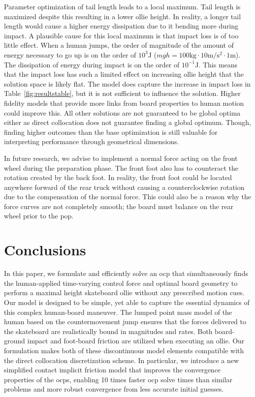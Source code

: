 \documentclass[default,iicol,pdflatex]{sn-jnl}
\begin{document}
Parameter optimization of tail length leads to a local maximum.
Tail length is maximized despite this resulting in a lower ollie height.
In reality, a longer tail length would cause a higher energy dissipation due to it bending more during impact.
A plausible cause for this local maximum is that impact loss is of too little effect.
When a human jumps, the order of magnitude of the amount of energy necessary to go up is on the order of $10^3\si{\joule}$ ($mgh=100\si{\kilo\gram}\cdot10\si{\meter\per\second\squared}\cdot1\si{\meter}$). The dissipation of energy during impact is on the order of $10^{-1}\si{\joule}$.
This means that the impact loss has such a limited effect on increasing ollie height that the solution space is likely flat.
The model does capture the increase in impact loss in Table~\ref{fig:resultstable}, but it is not sufficient to influence the solution. Higher fidelity models that provide more links from board properties to human motion could improve this.
All other solutions are not guaranteed to be global optima either as direct collocation does not guarantee finding a global optimum.
Though, finding higher outcomes than the base optimization is still valuable for interpreting performance through geometrical dimensions.

In future research, we advise to implement a normal force acting on the front wheel during the preparation phase.
The front foot also has to counteract the rotation created by the back foot.
In reality, the front foot could be located anywhere forward of the rear truck without causing a counterclockwise rotation due to the compensation of the normal force.
This could also be a reason why the force curves are not completely smooth; the board must balance on the rear wheel prior to the pop.

\section{Conclusions}
In this paper, we formulate and efficiently solve an \gls{ocp} that simultaneously finds the human-applied time-varying control force and optimal board geometry to perform a maximal height skateboard ollie without any prescribed motion cues. Our model is designed to be simple, yet able to capture the essential dynamics of this complex human-board maneuver. The lumped point mass model of the human based on the countermovement jump ensures that the forces delivered to the skateboard are realistically bound in magnitudes and rates. Both board-ground impact and foot-board friction are utilized when executing an ollie. Our formulation makes both of these discontinuous model elements compatible with the direct collocation discretization scheme. In particular, we introduce a new simplified contact implicit friction model that improves the convergence properties of the \glspl{ocp}, enabling 10 times faster \gls{ocp} solve times than similar problems and more robust convergence from less accurate initial guesses.
\end{document}
